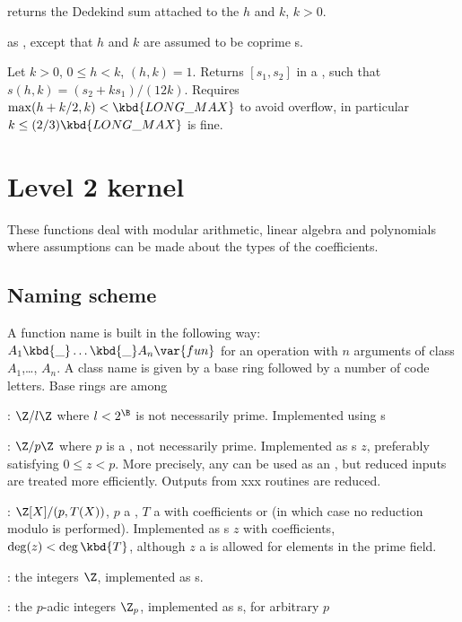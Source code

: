  returns the Dedekind sum attached to
the  $h$ and $k$, $k > 0$.

 as , except
that $h$ and $k$ are assumed to be coprime s.

Let $k > 0$, $0 \leq h < k$, $(h,k) = 1$. Returns $[s_1,s_2]$
in a , such that $s(h,k) = (s_2 + k s_1) / (12k)$.
Requires $\max(h + k/2, k) < \kbd{LONG\_MAX}$
to avoid overflow, in particular $k \leq (2/3)\kbd{LONG\_MAX}$ is fine.

\newpage
\chapter{Level 2 kernel}

These functions deal with modular arithmetic, linear algebra and polynomials
where assumptions can be made about the types of the coefficients.

\section{Naming scheme}\label{se:level2names}
A function name is built in the following way:
$A_1\kbd{\_}\dots\kbd{\_}A_n\var{fun}$ for an operation  with $n$
arguments of class $A_1$,\dots, $A_n$. A class name is given by a base ring
followed by a number of code letters. Base rings are among

  : $\Z/l\Z$ where $l < 2^{\B}$ is not necessarily prime. Implemented
            using s

  : $\Z/p\Z$ where $p$ is a , not necessarily prime.
Implemented as s $z$, preferably satisfying $0 \leq z < p$.
More precisely, any  can be used as an , but reduced
inputs are treated more efficiently. Outputs from xxx routines are
reduced.

  : $\Z[X]/(p,T(X))$, $p$ a , $T$ a  with 
coefficients or  (in which case no reduction modulo  is
performed). Implemented as s $z$ with  coefficients,
$\deg(z) < \deg \kbd{T}$, although $z$ a  is allowed for elements in
the prime field.

  :  the integers $\Z$, implemented as s.

  : the $p$-adic integers $\Z_p$, implemented as s, for arbitrary $p$

